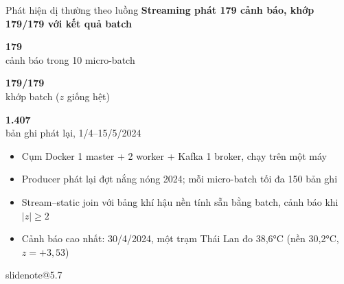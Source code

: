 \documentclass[t,aspectratio=169,12pt]{beamer}
\makeatletter
\newcommand{\slidenote}[1]{\ifcsname slidenote@#1\endcsname\note{\csname slidenote@#1\endcsname}\fi}
\newcommand{\ychinh}[1]{\vskip1mm{\bfseries #1}\par\vskip1mm}
\newcommand{\bignumS}[4]{%
  \begin{minipage}[t]{#4}\centering
    {\fontsize{22}{26}\selectfont\bfseries\color{#3}#1}\\[1pt]
    {\footnotesize #2}\end{minipage}}
\makeatother
\begin{document}
\begin{frame}{Phát hiện dị thường theo luồng}
  \ychinh{Streaming phát 179 cảnh báo, khớp 179/179 với kết quả batch}
  \begin{center}
    \bignumS{179}{cảnh báo trong 10 micro-batch}{badred}{4.2cm}
    \bignumS{179/179}{khớp batch ($z$ giống hệt)}{goodgreen}{4.2cm}
    \bignumS{1.407}{bản ghi phát lại, 1/4--15/5/2024}{hustblue}{4.4cm}
  \end{center}
  \begin{itemize}\small\setlength\itemsep{1mm}
    \item Cụm Docker 1 master + 2 worker + Kafka 1 broker, chạy trên một máy
    \item Producer phát lại đợt nắng nóng 2024; mỗi micro-batch tối đa 150 bản ghi
    \item Stream--static join với bảng khí hậu nền tính sẵn bằng batch, cảnh báo khi $|z| \ge 2$
    \item Cảnh báo cao nhất: 30/4/2024, một trạm Thái Lan đo 38,6°C (nền 30,2°C, $z = +3{,}53$)
  \end{itemize}
  \slidenote{5.7}
\end{frame}
\end{document}
